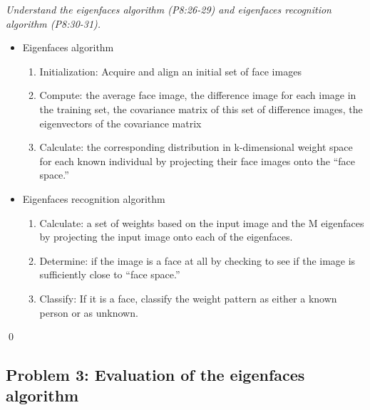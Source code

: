 \documentclass[
        ]{beamer}
\begin{document}
		\begin{frame}[t]{\subsecname}
			\begin{overprint}
			\emph{Understand the eigenfaces algorithm (P8:26-29) and eigenfaces recognition algorithm (P8:30-31).}
				\onslide<2> 
				\onslide<3> 
				\onslide<4> 
				\onslide<5> 
				\onslide<6> 
				\onslide<7>  
				\onslide<8>  
				\begin{itemize}
					\item Eigenfaces algorithm   				
					\begin{enumerate}
							\item Initialization: Acquire and align an initial set of face images
							\item Compute: the average face image, the difference image for each image in the training set, the covariance matrix of this set of difference images, the eigenvectors of the covariance matrix
							\item Calculate: the corresponding distribution in k-dimensional weight space for each known individual by projecting their face images onto the ``face space.''
						\end{enumerate}
				\end{itemize}
				\begin{itemize}
						\item Eigenfaces recognition algorithm			
					\begin{enumerate}
							\item Calculate: a set of weights based on the input image and the M eigenfaces by projecting the input image onto each of the eigenfaces.
							\item Determine: if the image is a face at all by checking to see if the image is sufficiently close to ``face space.''
							\item Classify: If it is a face, classify the weight pattern as either a known person or as unknown.
						\end{enumerate}
				\end{itemize}\qed
			\end{overprint}
		\end{frame}
		
\subsection{Problem 3: Evaluation of the eigenfaces algorithm}
\end{document}
